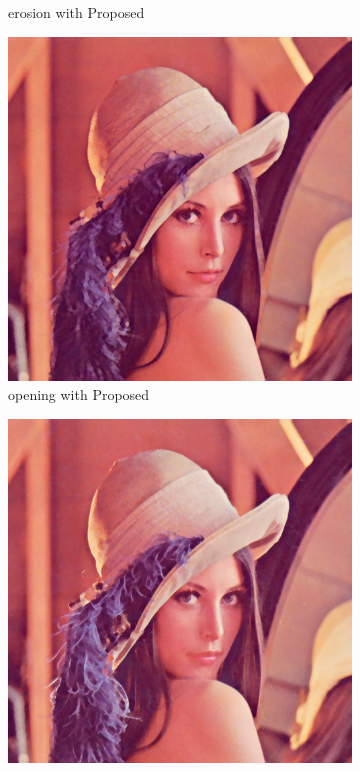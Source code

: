 \begin{figure}[!ht]
\begin{subfigure}[t]{0.22\textwidth}
    \caption{erosion with Proposed}
    \centering
  \end{subfigure}
\begin{subfigure}[t]{0.22\textwidth}
    \includegraphics[width=0.9\linewidth]{../project/images/outputs/compare_order/opening_Proposed.png}
    \caption{opening with Proposed}
    \centering
  \end{subfigure}
\begin{subfigure}[t]{0.22\textwidth}
    \includegraphics[width=0.9\linewidth]{../project/images/outputs/compare_order/closing_Proposed.png}

\end{subfigure}
\end{figure}
